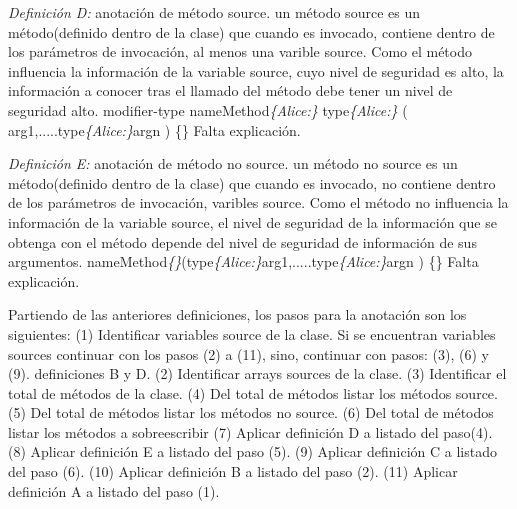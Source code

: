 \textit{Definición D:} anotación de método source.\newline 
un método source es un método(definido dentro de la clase)
que cuando es invocado, contiene dentro de los parámetros de invocación, al menos
una varible source. Como el método influencia la información de la variable
source, cuyo nivel de seguridad es alto, la información a conocer tras el
llamado del método debe tener un nivel de seguridad alto.\newline
modifier-type nameMethod\textit{\{Alice:\}} type\textit{\{Alice:\}}
( arg1,.....type\textit{\{Alice:\}}argn ) \{\}\newline
Falta explicación.

\textit{Definición E:} anotación de método no source.\newline
un método no source es un método(definido dentro de la
clase) que cuando es invocado, no contiene dentro de los parámetros de
invocación, varibles source. Como el método no influencia la información
de la variable source, el nivel de seguridad de la información que se obtenga
con el método depende del nivel de seguridad de información de sus argumentos.\newline 
nameMethod\textit{\{\}}(type\textit{\{Alice:\}}arg1,.....type\textit{\{Alice:\}}argn ) \{\}\newline
Falta explicación.

Partiendo de las anteriores definiciones, los pasos para la anotación son los
siguientes:\newline
(1) Identificar variables source de la clase. Si se encuentran variables sources
continuar con los pasos (2) a (11), sino, continuar con pasos: (3), (6) y (9).
definiciones B y D.\newline
(2) Identificar arrays sources de la clase.
(3) Identificar el total de métodos de la clase.\newline
(4) Del total de métodos listar los métodos source.\newline
(5) Del total de métodos listar los métodos no source.\newline
(6) Del total de métodos listar los métodos a sobreescribir\newline
(7) Aplicar definición D a listado del paso(4).\newline
(8) Aplicar definición E a listado del paso (5).\newline
(9) Aplicar definición C a listado del paso (6).\newline
(10) Aplicar definición B a listado del paso (2).\newline
(11) Aplicar definición A a listado del paso (1).\newline

